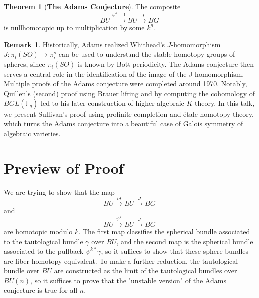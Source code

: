 \documentclass{article}
\theoremstyle{definition}
\newtheorem{theorem}{Theorem}[section]
\theoremstyle{definition}
\theoremstyle{definition}
\newtheorem{remark}{Remark}[theorem]
\theoremstyle{definition}
\theoremstyle{definition}
\theoremstyle{definition}
\theoremstyle{definition}
\begin{document}
	\begin{tcolorbox}[colback=red!5!white,colframe=red!30!white]
	\begin{theorem}[\underline{\textbf{The Adams Conjecture}}]
	The composite 
	\[BU\xrightarrow{\psi^k-1}BU\xrightarrow{J}BG\]
	is nullhomotopic up to multiplication by some $k^n$. 
	\end{theorem}
	\end{tcolorbox}
	
	
	\begin{tcolorbox}[colback=green!5!white,colframe=green!30!white]
	\begin{remark}
	Historically, Adams realized Whithead's $J$-homomorphism $J: \pi_i(SO)\to \pi^s_i$ can be used to understand the stable homotopy groups of spheres, since $\pi_i(SO)$ is known by Bott periodicity. The Adams conjecture then serves a central role in the identification of the image of the J-homomorphism.
	\\

	Multiple proofs of the Adams conjecture were completed around 1970. Notably, Quillen's (second) proof using Brauer lifting and by computing the cohomology of $BGL(\mathbb{F}_q)$ led to his later construction of higher algebraic $K$-theory. In this talk, we present Sullivan's proof using profinite completion and \'etale homotopy theory, which turns the Adams conjecture into a beautiful case of Galois symmetry of algebraic varieties.


	\end{remark}
	\end{tcolorbox}



\section{Preview of Proof}

We are trying to show that the map
\[BU\xrightarrow{id} BU\xrightarrow{J}BG\]
and 
\[BU\xrightarrow{\psi^k} BU\xrightarrow{J}BG\]
are homotopic modulo $k$. The first map classifies the spherical bundle associated to the tautological bundle $\gamma$ over $BU$, and the second map is the spherical bundle associated to the pullback $\psi^{k*}\gamma$, so it suffices to show that these sphere bundles are fiber homotopy equivalent. To make a further reduction, the tautological bundle over $BU$ are constructed as the limit of the tautological bundles over $BU(n)$, so it suffices to prove that the "unstable version" of the Adams conjecture is true for all $n$. 
\end{document}
